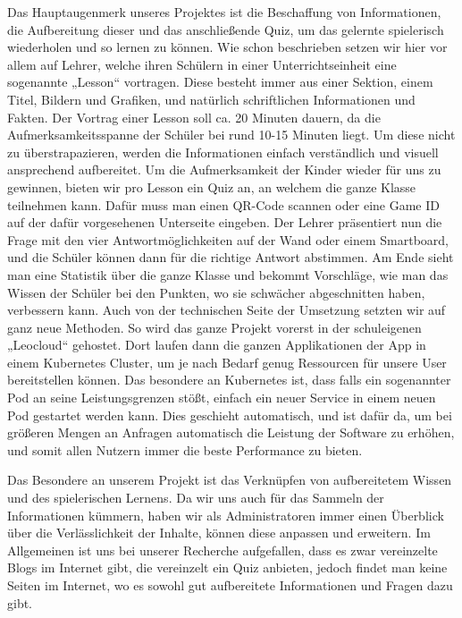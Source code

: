 Das Hauptaugenmerk unseres Projektes ist die Beschaffung von Informationen, die Aufbereitung dieser und das anschließende Quiz, um das gelernte spielerisch wiederholen und so lernen zu können. Wie schon beschrieben setzen wir hier vor allem auf Lehrer, welche ihren Schülern in einer Unterrichtseinheit eine sogenannte „Lesson“ vortragen. Diese besteht immer aus einer Sektion, einem Titel, Bildern und Grafiken, und natürlich schriftlichen Informationen und Fakten. Der Vortrag einer Lesson soll ca. 20 Minuten dauern, da die Aufmerksamkeitsspanne der Schüler bei rund 10-15 Minuten liegt. Um diese nicht zu überstrapazieren, werden die Informationen einfach verständlich und visuell ansprechend aufbereitet. Um die Aufmerksamkeit der Kinder wieder für uns zu gewinnen, bieten wir pro Lesson ein Quiz an, an welchem die ganze Klasse teilnehmen kann. Dafür muss man einen QR-Code scannen oder eine Game ID auf der dafür vorgesehenen Unterseite eingeben. Der Lehrer präsentiert nun die Frage mit den vier Antwortmöglichkeiten auf der Wand oder einem Smartboard, und die Schüler können dann für die richtige Antwort abstimmen. Am Ende sieht man eine Statistik über die ganze Klasse und bekommt Vorschläge, wie man das Wissen der Schüler bei den Punkten, wo sie schwächer abgeschnitten haben, verbessern kann. Auch von der technischen Seite der Umsetzung setzten wir auf ganz neue Methoden. So wird das ganze Projekt vorerst in der schuleigenen „Leocloud“ gehostet. Dort laufen dann die ganzen Applikationen der App in einem Kubernetes Cluster, um je nach Bedarf genug Ressourcen für unsere User bereitstellen können. Das besondere an Kubernetes ist, dass falls ein sogenannter Pod an seine Leistungsgrenzen stößt, einfach ein neuer Service in einem neuen Pod gestartet werden kann. Dies geschieht automatisch, und ist dafür da, um bei größeren Mengen an Anfragen automatisch die Leistung der Software zu erhöhen, und somit allen Nutzern immer die beste Performance zu bieten. 

Das Besondere an unserem Projekt ist das Verknüpfen von aufbereitetem Wissen und des spielerischen Lernens. Da wir uns auch für das Sammeln der Informationen kümmern, haben wir als Administratoren immer einen Überblick über die Verlässlichkeit der Inhalte, können diese anpassen und erweitern. Im Allgemeinen ist uns bei unserer Recherche aufgefallen, dass es zwar vereinzelte Blogs im Internet gibt, die vereinzelt ein Quiz anbieten, jedoch findet man keine Seiten im Internet, wo es sowohl gut aufbereitete Informationen und Fragen dazu gibt.  

